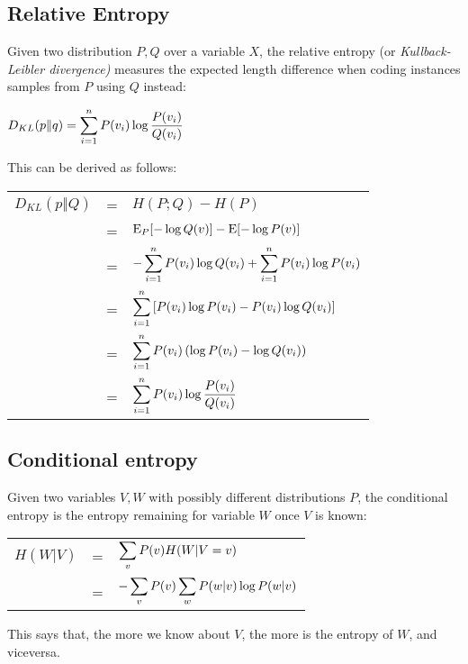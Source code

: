 \subsection{Relative Entropy}
\begin{definition}
Given two distribution $P, Q$ over a variable $X$, the relative entropy (or \textit{Kullback-Leibler divergence)} measures the expected length difference when coding instances samples from $P$ using $Q$ instead:
\begin{center}
	$\displaystyle D_{KL}(p\Vert q)=\displaystyle\sum_{i=1}^nP(v_i)\log{\frac{P(v_i)}{Q(v_i)}}$
\end{center}
\end{definition}
This can be derived as follows:
\begin{center}
	\begin{tabular}{rcl}
		$D_{KL}(p\Vert Q)$&=&$H(P;Q)-H(P)$\\
		&=&$\text{E}_P[-\log{Q(v)}]-\text{E}[-\log{P(v)}]$\\
		&=&$-\displaystyle\sum_{i=1}^nP(v_i)\log{Q(v_i)}+\displaystyle\sum_{i=1}^nP(v_i)\log{P(v_i)}$\\
		&=&$\displaystyle\sum_{i=1}^n\left[P(v_i)\log{P(v_i)}-P(v_i)\log{Q(v_i)}\right]$\\
		&=&$\displaystyle\sum_{i=1}^nP(v_i)\left(\log{P(v_i)}-\log{Q(v_i)}\right)$\\
		&=&$\displaystyle\sum_{i=1}^nP(v_i)\log{\frac{P(v_i)}{Q(v_i)}}$
	\end{tabular}
\end{center}
%
%
\subsection{Conditional entropy}
\begin{definition}
Given two variables $V,W$ with possibly different distributions $P$, the conditional entropy is the entropy remaining for variable $W$ once $V$ is known:
\begin{center}
	\begin{tabular}{rcl}
		$H(W\vert V)$&=&$\displaystyle\sum_vP(v)H(W\vert V=v)$\\
		&=&$-\displaystyle\sum_{v}P(v)\displaystyle\sum_wP(w\vert v)\log{P(w\vert v)}$
	\end{tabular}
\end{center}
\end{definition}
This says that, the more we know about $V$, the more is the entropy of $W$, and viceversa.

